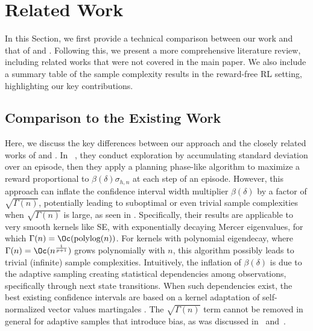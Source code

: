 \section{Related Work}
\label{sec:relatedworks}
In this Section, we first provide a technical comparison between our work and that of \citet{qiu2021reward} and \citet{vakilireward}. Following this, we present a more comprehensive literature review, including related works that were not covered in the main paper. We also include a summary table of the sample complexity results in the reward-free RL setting, highlighting our key contributions.

\subsection{Comparison to the Existing Work} \label{appx:comp}

Here, we discuss the key differences between our approach and the closely related works of \citet{qiu2021reward} and \citet{vakilireward}. In ~\citet{qiu2021reward}, they conduct exploration by accumulating standard deviation over an episode, then they apply a planning phase-like algorithm to maximize a reward proportional to $\beta(\delta)\sigma_{h,n}$ at each step of an episode. However, this approach can inflate the confidence interval width multiplier $\beta(\delta)$ by a factor of $\sqrt{\Gamma(n)}$, potentially leading to suboptimal or even trivial sample complexities when $\sqrt{\Gamma(n)}$ is large, as seen in \cite{qiu2021reward}. Specifically, their results are applicable to very smooth kernels like SE, with exponentially decaying Mercer eigenvalues, for which $\Gamma(n)=\Oc(\text{polylog}(n))$. For kernels with polynomial eigendecay, where $\Gamma(n)=\Oc(n^{\frac{1}{p+1}})$ grows polynomially with $n$, this algorithm possibly leads to trivial (infinite) sample complexities. Intuitively, the inflation of $\beta(\delta)$ is due to the  adaptive sampling creating statistical dependencies among observations, specifically through next state transitions. When such dependencies exist, the best existing confidence intervals are based on a kernel adaptation of self-normalized vector values martingales \citep{abbasi2013online}. The $\sqrt{\Gamma(n)}$ term cannot be removed in general for adaptive samples that introduce bias, as was discussed in~\citet{vakili2024open} and~\citet{lattimore2023lower}.  

